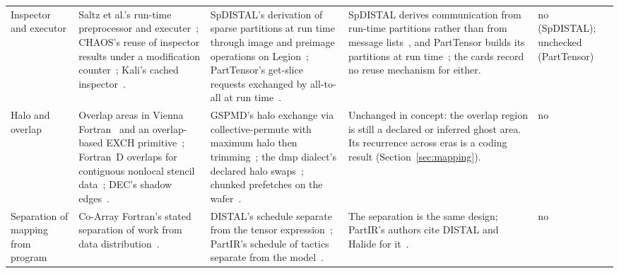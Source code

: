 \begin{table}[t]
\begin{tabular}{p{}p{}p{}p{}p{}}
Inspector and executor & Saltz et al.'s run-time preprocessor and executer~\cite{saltz1990runtime}; CHAOS's reuse of inspector results under a modification counter~\cite{ponnusamy1995runtime}; Kali's cached inspector~\cite{mehrotra1990kali}. & SpDISTAL's derivation of sparse partitions at run time through image and preimage operations on Legion~\cite{yadav2022spdistal}; PartTensor's get-slice requests exchanged by all-to-all at run time~\cite{vaidya2025distributed}. & SpDISTAL derives communication from run-time partitions rather than from message lists~\cite{yadav2022spdistal}, and PartTensor builds its partitions at run time~\cite{vaidya2025distributed}; the cards record no reuse mechanism for either. & no (SpDISTAL); unchecked (PartTensor) \\
Halo and overlap & Overlap areas in Vienna Fortran~\cite{chapman1992vienna} and an overlap-based EXCH primitive~\cite{zima1993compiling}; Fortran~D overlaps for contiguous nonlocal stencil data~\cite{hiranandani1992evaluation}; DEC's shadow edges~\cite{harris1995dechpf}. & GSPMD's halo exchange via collective-permute with maximum halo then trimming~\cite{xu2021gspmd}; the dmp dialect's declared halo swaps~\cite{bisbas2024shared}; chunked prefetches on the wafer~\cite{stawinoga2026mlir}. & Unchanged in concept: the overlap region is still a declared or inferred ghost area. Its recurrence across eras is a coding result (Section~\ref{sec:mapping}). & no \\
Separation of mapping from program & Co-Array Fortran's stated separation of work from data distribution~\cite{numrich1998coarray}. & DISTAL's schedule separate from the tensor expression~\cite{yadav2022distal}; PartIR's schedule of tactics separate from the model~\cite{alabed2025partir}. & The separation is the same design; PartIR's authors cite DISTAL and Halide for it~\cite{alabed2025partir,yadav2022distal}. & no \\
\bottomrule
\end{tabular}
\end{table}

